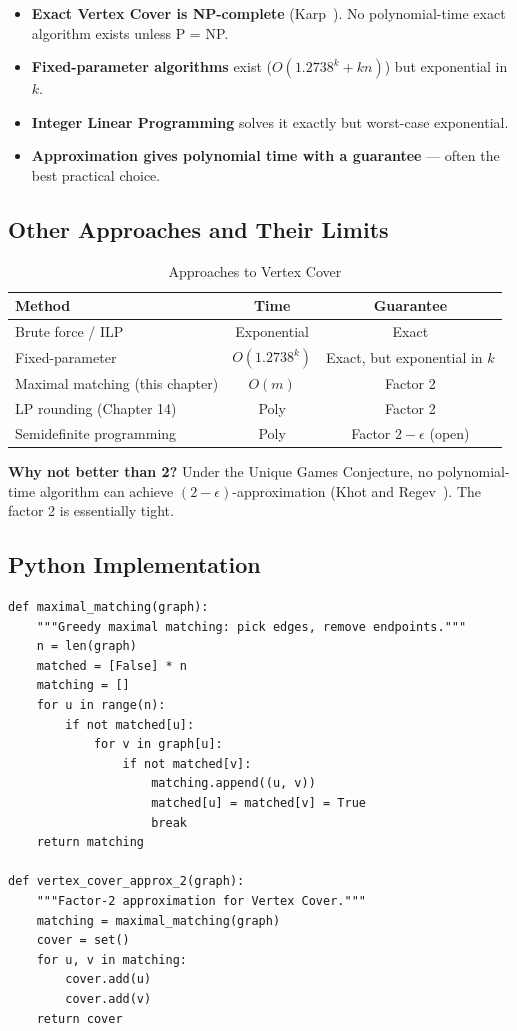 \begin{itemize}
    \item \textbf{Exact Vertex Cover is NP-complete} (Karp~\cite{karp72}). No polynomial-time exact algorithm exists unless P = NP.
    \item \textbf{Fixed-parameter algorithms} exist ($O(1.2738^k + kn)$) but exponential in $k$.
    \item \textbf{Integer Linear Programming} solves it exactly but worst-case exponential.
    \item \textbf{Approximation gives polynomial time with a guarantee} — often the best practical choice.
\end{itemize}

\subsection{Other Approaches and Their Limits}

\begin{table}[H]
\centering
\caption{Approaches to Vertex Cover}
\begin{tabular}{lcc}
\toprule
Method & Time & Guarantee \\
\midrule
Brute force / ILP & Exponential & Exact \\
Fixed-parameter & $O(1.2738^k)$ & Exact, but exponential in $k$ \\
Maximal matching (this chapter) & $O(m)$ & Factor 2 \\
LP rounding (Chapter 14) & Poly & Factor 2 \\
Semidefinite programming & Poly & Factor $2-\epsilon$ (open) \\
\bottomrule
\end{tabular}
\end{table}

\textbf{Why not better than 2?} Under the Unique Games Conjecture, no polynomial-time algorithm can achieve $(2-\epsilon)$-approximation (Khot and Regev~\cite{khot-regev08}). The factor 2 is essentially tight.

\subsection{Python Implementation}

\begin{lstlisting}[style=python, caption=Vertex Cover 2-Approximation]
def maximal_matching(graph):
    """Greedy maximal matching: pick edges, remove endpoints."""
    n = len(graph)
    matched = [False] * n
    matching = []
    for u in range(n):
        if not matched[u]:
            for v in graph[u]:
                if not matched[v]:
                    matching.append((u, v))
                    matched[u] = matched[v] = True
                    break
    return matching

def vertex_cover_approx_2(graph):
    """Factor-2 approximation for Vertex Cover."""
    matching = maximal_matching(graph)
    cover = set()
    for u, v in matching:
        cover.add(u)
        cover.add(v)
    return cover
\end{lstlisting}


